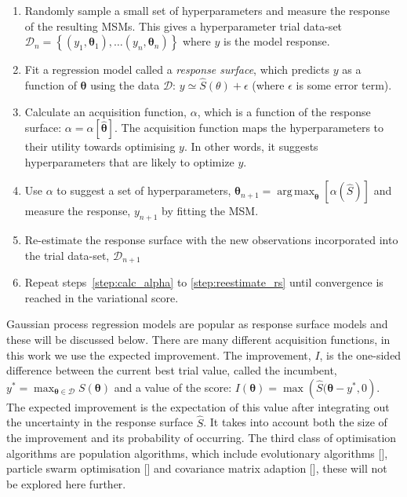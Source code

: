 \documentclass[journal=jacsat,manuscript=article]{achemso}
\DeclareMathOperator*{\argmax}{arg\,max}
\begin{document}
\begin{enumerate}
    \item Randomly sample a small set of hyperparameters and measure the response of the resulting MSMs. This gives a hyperparameter trial data-set $\mathcal{D}_{n}=\left\{(y_1, \bm{\theta}_1),  \ldots (y_n, \bm{\theta}_n) \right \}$ where $y$ is the model response.
    \item Fit a regression model called a \emph{response surface}, which predicts $y$ as a function of $\bm{\theta}$ using the data $\mathcal{D}$: $y \simeq \hat{S}(\theta) + \epsilon$ (where $\epsilon$ is some error term). 
    \item \label{step:calc_alpha} Calculate an acquisition function, $\alpha$, which is a function of the response surface: $\alpha=\alpha\left[\hat{\bm{\theta}}\right]$. The acquisition function maps the hyperparameters to their utility towards optimising $y$. In other words, it suggests hyperparameters that are likely to optimize $y$. 
    \item Use $\alpha$ to suggest a set of hyperparameters, $\bm{\theta}_{n+1} = \argmax_{\bm{\theta}}{\left[\alpha(\hat{S})\right]}$ and measure the response, $y_{n+1}$ by fitting the MSM.  
    \item \label{step:reestimate_rs} Re-estimate the response surface with the new observations incorporated into the trial data-set, $\mathcal{D}_{n+1}$
    \item Repeat steps~\ref{step:calc_alpha} to \ref{step:reestimate_rs} until convergence is reached in the variational score. 
\end{enumerate}

Gaussian process regression models  are popular as response surface models and these will be discussed below. There are many different acquisition functions, in this work we use the expected improvement.  The improvement, $I$, is the one-sided difference between the current best trial value, called the incumbent, $y^{*} = \max_{\bm{\theta}\in \mathcal{D}}{S(\bm{\theta})}$ and a value of the score: $I(\bm{\theta}) = \max{\left(\hat{S}(\bm{\theta}   -y^{*}, 0\right)}$. The expected improvement is the expectation of this value after integrating out the uncertainty in the response surface $\hat{S}$. It takes into account both the size of the improvement and its probability of occurring.  The third class of optimisation algorithms are population algorithms, which include evolutionary algorithms [], particle swarm optimisation [] and covariance matrix adaption [], these will not be explored here further. 
\end{document}
